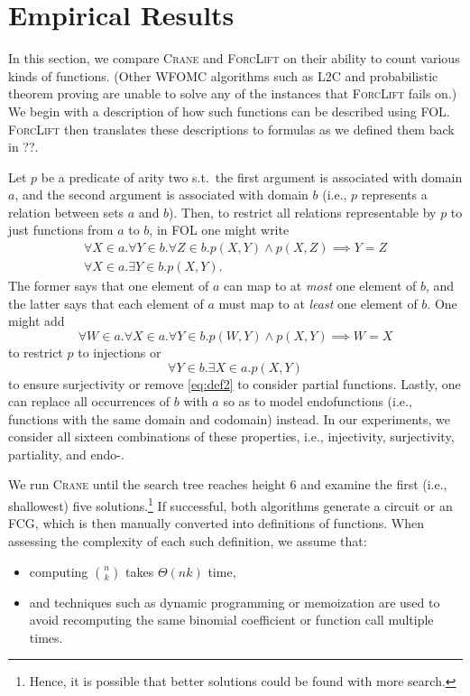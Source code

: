 \section{Empirical Results}\label{sec:results} %

In this section, we compare \textsc{Crane} and \textsc{ForcLift}
\citep{DBLP:conf/ijcai/BroeckTMDR11} on their ability to count various kinds of
functions. (Other WFOMC algorithms such as \textsc{L2C}
\citep{DBLP:conf/kr/KazemiP16} and probabilistic theorem proving
\citep{DBLP:journals/cacm/GogateD16} are unable to solve any of the instances
that \textsc{ForcLift} fails on.) We begin with a description of how such
functions can be described using FOL\@. \textsc{ForcLift} then translates these
descriptions to formulas as we defined them back in ??.

Let $p$ be a predicate of arity two s.t.\ the first argument is associated with
domain $a$, and the second argument is associated with domain $b$ (i.e., $p$
represents a relation between sets $a$ and $b$). Then, to restrict all relations
representable by $p$ to just functions from $a$ to $b$, in FOL one
might write
\begin{gather}
  \forall X \in a. \forall Y \in b. \forall Z \in b. p(X, Y) \land p(X, Z) \implies Y = Z\nonumber \\
  \forall X \in a. \exists Y \in b. p(X, Y). \label{eq:def2}
\end{gather}
The former says that one element of $a$ can map to at \emph{most} one element of
$b$, and the latter says that each element of $a$ must map to at \emph{least}
one element of $b$. One might add
\[
  \forall W \in a. \forall X \in a. \forall Y \in b. p(W, Y) \land p(X, Y) \implies W = X
\]
to restrict $p$ to injections or
\[
  \forall Y \in b. \exists X \in a. p(X, Y)
\]
to ensure surjectivity or remove \cref{eq:def2} to consider partial functions.
Lastly, one can replace all occurrences of $b$ with $a$ so as to model
endofunctions (i.e., functions with the same domain and codomain) instead. In
our experiments, we consider all sixteen combinations of these properties, i.e.,
injectivity, surjectivity, partiality, and endo-.

We run \textsc{Crane} until the search tree reaches height 6 and examine the
first (i.e., shallowest) five solutions.\footnote{Hence, it is possible that
  better solutions could be found with more search.} If successful, both
algorithms generate a circuit or an FCG, which is then manually converted into
definitions of functions. When assessing the complexity of each such definition,
we assume that:
\begin{itemize}
  \item computing $\binom{n}{k}$ takes $\Theta(nk)$ time,
  \item and techniques such as dynamic programming or memoization are used to
        avoid recomputing the same binomial coefficient or function call
        multiple times.
\end{itemize}

